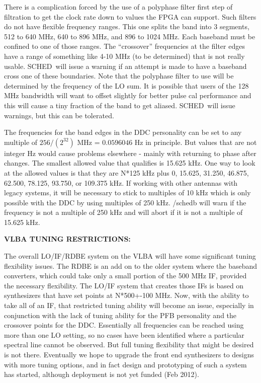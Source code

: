 \documentclass{report}
\newcommand{\schedb}{{\sc SCHED~}}
\begin{document}
There is a complication forced by the use of a polyphase filter first
step of filtration to get the clock rate down to values the FPGA can
support.  Such filters do not have flexible frequency ranges.  This
one splits the band into 3 segments, 512 to 640 MHz, 640 to 896 MHz,
and 896 to 1024 MHz.  Each baseband must be confined to one of those
ranges.  The ``crossover'' frequencies at the filter edges have a
range of something like 4-10 MHz (to be determined) that is not really
usable.  \schedb will issue a warning if an attempt is made to have a
baseband cross one of these boundaries.  Note that the polyphase
filter to use will be determined by the frequency of the LO sum.  It
is possible that users of the 128 MHz bandwidth will want to offset
slightly for better pulse cal performance and this will cause a tiny
fraction of the band to get aliased.  \schedb will issue warnings, but
this can be tolerated.

The frequencies for the band edges in the DDC personality can be set
to any multiple of $256 / (2^{32})$ MHz = $0.0596046$ Hz in principle.
But values that are not integer Hz would cause problems elsewhere -
mainly with returning to phase after changes.  The smallest allowed
value that qualifies is 15.625 kHz.  One way to look at the allowed
values is that they are N*125 kHz plus 0, 15.625, 31.250, 46.875,
62.500, 78.125, 93.750, or 109.375 kHz.  If working with other
antennas with legacy systems, it will be necessary to stick to
multiples of 10 kHz which is only possible with the DDC by using
multiples of 250 kHz.  /schedb will warn if the frequency is not a
multiple of 250 kHz and will abort if it is not a multiple of 15.625
kHz.

{\bf VLBA TUNING RESTRICTIONS:}

The overall LO/IF/RDBE system on the VLBA will have some significant
tuning flexibility issues.  The RDBE is an add on to the older system
where the baseband converters, which could take only a small portion
of the 500 MHz IF, provided the necessary flexibility.  The LO/IF
system that creates those IFs is based on synthesizers that have
set points at N*500+-100 MHz.  Now, with the ability to take all of
an IF, that restricted tuning ability will become an issue, especially
in conjunction with the lack of tuning ability for the PFB personality
and the crossover points for the DDC.  Essentially all frequencies
can be reached using more than one LO setting, so no cases have been
identified where a particular spectral line cannot be observed.  But
full tuning flexibility that might be desired is not there.  Eventually
we hope to upgrade the front end synthesizers to designs with more
tuning options, and in fact design and prototyping of such a system
has started, although deployment is not yet funded (Feb 2012).
\end{document}
